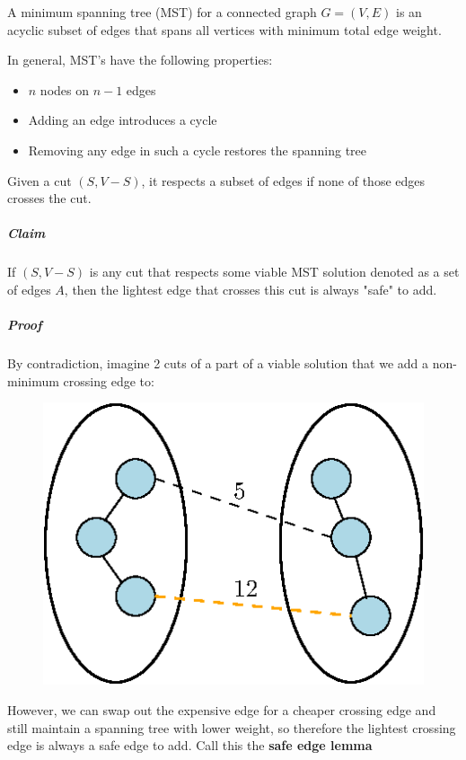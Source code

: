 \documentclass[11pt]{article}
\begin{document}
	A minimum spanning tree (MST) for a connected graph $G = (V, E)$ is an acyclic subset of edges that spans all vertices with minimum total edge weight.
	
	In general, MST's have the following properties:
	\begin{itemize}
		\item $n$ nodes on $n - 1$ edges
		\item Adding an edge introduces a cycle
		\item Removing any edge in such a cycle restores the spanning tree
	\end{itemize}

Given a cut $(S, V - S)$, it respects a subset of edges if none of those edges crosses the cut.

\subparagraph{Claim} If $(S, V - S)$ is any cut that respects some viable MST solution denoted as a set of edges $A$, then the lightest edge that crosses this cut is always "safe" to add.

\subparagraph{Proof} By contradiction, imagine 2 cuts of a part of a viable solution that we add a non-minimum crossing edge to:

	\begin{figure}[htb]
		\centering
		\includegraphics{mst-safe-cut.eps}
		\label{fig:figure}
	\end{figure}
	However, we can swap out the expensive edge for a cheaper crossing edge and still maintain a spanning tree with lower weight, so therefore the lightest crossing edge is always a safe edge to add. Call this the \textbf{safe edge lemma}


%		
%		


\end{document}
